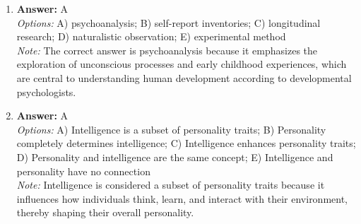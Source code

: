 \documentclass[12pt]{article}
\begin{document}
\begin{enumerate}[label=\arabic*.]
\item \textbf{Answer:} A
\\ \textit{Options:} A) psychoanalysis; B) self-report inventories; C) longitudinal research; D) naturalistic observation; E) experimental method
\\ \textit{Note:} The correct answer is psychoanalysis because it emphasizes the exploration of unconscious processes and early childhood experiences, which are central to understanding human development according to developmental psychologists.
\item \textbf{Answer:} A
\\ \textit{Options:} A) Intelligence is a subset of personality traits; B) Personality completely determines intelligence; C) Intelligence enhances personality traits; D) Personality and intelligence are the same concept; E) Intelligence and personality have no connection
\\ \textit{Note:} Intelligence is considered a subset of personality traits because it influences how individuals think, learn, and interact with their environment, thereby shaping their overall personality.
\end{enumerate}
\end{document}
